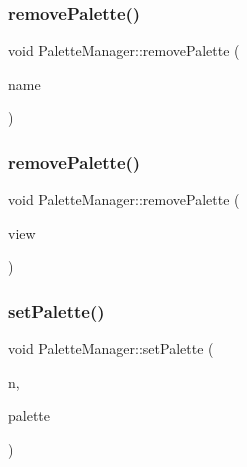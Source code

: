 \mbox{\label{class_palette_manager_a5ec728fa0e293780cb1f9cf0b9256cd3}} 
\subsubsection{\texorpdfstring{removePalette()}{removePalette()}\hspace{0.1cm}{\footnotesize\ttfamily [1/2]}}
{\footnotesize\ttfamily void Palette\+Manager\+::remove\+Palette (\begin{DoxyParamCaption}\item[{const Q\+String \&}]{name }\end{DoxyParamCaption})}

\mbox{\label{class_palette_manager_abd43d46715021de5b0ce13669c0c0ecd}} 
\subsubsection{\texorpdfstring{removePalette()}{removePalette()}\hspace{0.1cm}{\footnotesize\ttfamily [2/2]}}
{\footnotesize\ttfamily void Palette\+Manager\+::remove\+Palette (\begin{DoxyParamCaption}\item[{const \mbox{\hyperlink{class_palette}{Palette}} \&}]{view }\end{DoxyParamCaption})}

\mbox{\label{class_palette_manager_a55561ab522befd15cf8719417025a00e}} 
\subsubsection{\texorpdfstring{setPalette()}{setPalette()}}
{\footnotesize\ttfamily void Palette\+Manager\+::set\+Palette (\begin{DoxyParamCaption}\item[{\mbox{\hyperlink{palettemanager_8h_adf4610684920d9165d0d74c1ea45b269}{Palette\+Role}}}]{n,  }\item[{const \mbox{\hyperlink{class_palette}{Palette}} \&}]{palette }\end{DoxyParamCaption})}



